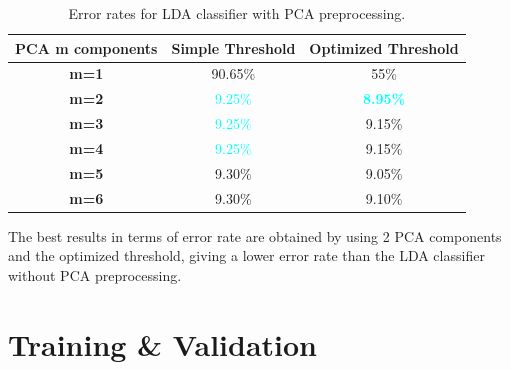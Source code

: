 \documentclass[12pt]{report}
\begin{document}
\begin{table}[H]
    \centering
    \begin{tabular}{|c|c|c|}
        \hline
        \rowcolor{blue!10}
        \textbf{PCA m components} & \textbf{Simple Threshold} & \textbf{Optimized Threshold}      \\
        \hline
        \textbf{m=1}              & 90.65\%                   & 55\%                              \\
        \hline
        \textbf{m=2}              & \textcolor{cyan}{9.25\%}  & \textcolor{cyan}{\textbf{8.95\%}} \\
        \hline
        \textbf{m=3}              & \textcolor{cyan}{9.25\%}  & 9.15\%                            \\
        \hline
        \textbf{m=4}              & \textcolor{cyan}{9.25\%}  & 9.15\%                            \\
        \hline
        \textbf{m=5}              & 9.30\%                    & 9.05\%                            \\
        \hline
        \textbf{m=6}              & 9.30\%                    & 9.10\%                            \\
        \hline
    \end{tabular}
    \caption{Error rates for LDA classifier with PCA preprocessing.}
    \label{tab:LDA_PCA_error}
\end{table}
\noindent
The best results in terms of error rate are obtained by using 2 PCA components and the optimized threshold, giving a lower error rate than the LDA classifier without PCA preprocessing.

\chapter{Training \& Validation}
\end{document}
